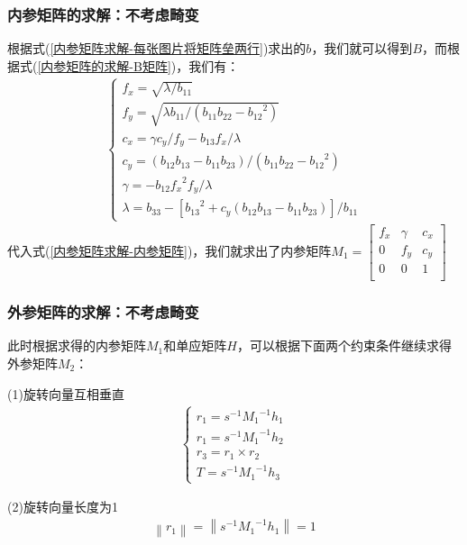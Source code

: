 \documentclass[aspectratio=43]{beamer}
\begin{document}
	\begin{frame}
		\frametitle{内参矩阵的求解：不考虑畸变}
		根据式(\ref{内参矩阵求解-每张图片将矩阵垒两行})求出的$b$，我们就可以得到$B$，而根据式(\ref{内参矩阵的求解-B矩阵})，我们有：\\
		\begin{align}
			\begin{cases}
				f_x=\sqrt{{{\lambda}\big/{b_{11}}}}\\ \nonumber
				f_y=\sqrt{{{\lambda b_{11}}\big/{\left( b_{11}b_{22}-{b_{12}}^2 \right)}}}\\ \nonumber
				c_x={{\gamma  c_y}\big/{f_y}}-{{b_{13}f_x}\big/{\lambda}}\\ \nonumber
				c_y={{\left( b_{12}b_{13}-b_{11}b_{23} \nonumber \right)}\big/{\left( b_{11}b_{22}-{b_{12}}^2 \right)}}\\
				\gamma =-{{b_{12}{f_x}^2f_y}\big/{\lambda}}\\ \nonumber
				\lambda =b_{33}-{{\left[ {b_{13}}^2+c_y\left( b_{12}b_{13}-b_{11}b_{23} \right) \right]}\big/{b_{11}}} \nonumber
			\end{cases}
		\end{align}
			代入式(\ref{内参矩阵求解-内参矩阵})，我们就求出了内参矩阵$M_1=\left[ \begin{matrix}
				f_x&		\gamma&		c_x\\
				0&		f_y&		c_y\\
				0&		0&		1\\
			\end{matrix} \right] $
				
		
	\end{frame}	
	
	
	
	
	\begin{frame}
		\frametitle{外参矩阵的求解：不考虑畸变}
		此时根据求得的内参矩阵$M_1$和单应矩阵$H$，可以根据下面两个约束条件继续求得外参矩阵$M_2$：
		\begin{block}{(1)旋转向量互相垂直}
			\begin{align}
				\begin{cases}
					r_1=s^{-1}{M_1}^{-1}h_1\\ \nonumber
					r_1=s^{-1}{M_1}^{-1}h_2\\ \nonumber
					r_3=r_1\times r_2\\ \nonumber
					T=s^{-1}{M_1}^{-1}h_3 \nonumber
				\end{cases}
			\end{align}
		\end{block}
		\begin{block}{(2)旋转向量长度为1}
			\begin{align}
				\left\| r_1 \right\| =\left\| s^{-1}{M_1}^{-1}h_1 \right\| =1 \nonumber
			\end{align}
		\end{block}
	\end{frame}	
	
\end{document}

